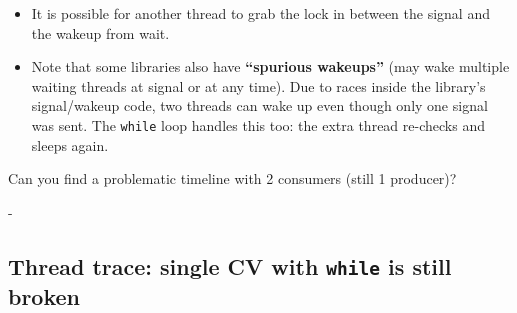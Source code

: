 \documentclass[11pt,a4paper]{article}
\makeatletter
\newcommand{\keepspace}[1]{\par\penalty-100\begingroup
  \setlength{\dimen@}{#1}\dimen@ii\pagegoal\advance\dimen@ii-\pagetotal
  \ifdim\dimen@>\dimen@ii\ifdim\dimen@ii>\z@\vfil\fi\break\fi\endgroup}
\makeatother
\begin{document}
\begin{keybox}
\begin{itemize}
  \item It is possible for another thread to grab the lock in between the
        signal and the wakeup from wait.
  \item Note that some libraries also have \textbf{``spurious wakeups''}
        (may wake multiple waiting threads at signal or at any time). Due
        to races inside the library's signal/wakeup code, two threads can
        wake up even though only one signal was sent. The \texttt{while}
        loop handles this too: the extra thread re-checks and sleeps again.
\end{itemize}
\end{keybox}

\begin{quizbox}
Can you find a problematic timeline with 2 consumers (still 1 producer)?
\end{quizbox}

\keepspace{36\baselineskip}
\subsection{Thread trace: single CV with \texttt{while} is still broken}
\end{document}
